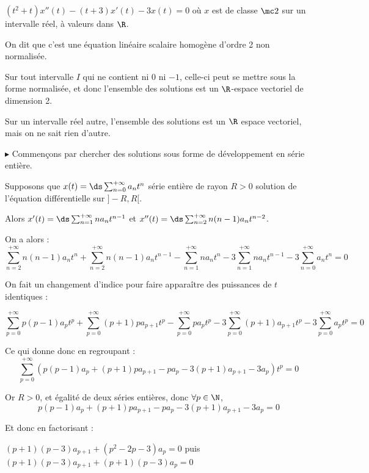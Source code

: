 \begin{exemple}
    $(t^2 + t) x''(t) - (t + 3) x'(t) - 3x(t) = 0$ où $x$ est de classe 
    $\mc 2$ sur un intervalle réel, à valeurs dans $\R$.

    On dit que c'est une équation linéaire scalaire homogène d'ordre 2 non normalisée. 

    Sur tout intervalle $I$ qui ne contient ni $0$ ni $-1$, celle-ci peut se mettre sous 
    la forme normalisée, et donc l'ensemble des solutions est un $\R$-espace vectoriel
    de dimension 2.

    Sur un intervalle réel autre, l'ensemble des solutions est un $\R$ espace vectoriel, mais 
    on ne sait rien d'autre. 

    \avspace $\blacktriangleright$ Commençons par chercher des solutions sous forme de 
    développement en série entière. 


    \svspace Supposons que $x(t) = \ds \sum_{n = 0}^{+ \infty} a_n t^n$ série entière de rayon 
    $R > 0$ solution de l'équation différentielle sur $]-R, R[$.

    Alors $x'(t) = \ds \sum_{n = 1}^{+ \infty} n a_n t^{n - 1}$ et $x''(t) = \ds \sum_{n = 2}^{+ \infty} n (n - 1) a_n t^{n - 2}$.

    On a alors : 
    $$\sum_{n = 2}^{+ \infty} n(n - 1) a_n t^n + \sum_{n = 2}^{+ \infty} n(n - 1) a_n t^{n - 1} - \sum_{n = 1}^{+ \infty} n a_n t^n - 3 \sum_{n = 1}^{+ \infty} n a_n t^{n - 1} - 3 \sum_{n = 0}^{+ \infty} a_n t^n = 0$$

    On fait un changement d'indice pour faire apparaître des puissances de $t$ identiques :

    $$\sum_{p = 0}^{+ \infty} p(p - 1) a_p t^p + \sum_{p = 0}^{+ \infty} (p + 1) p a_{p + 1} t^p - \sum_{p = 0}^{+ \infty} p a_p t^p - 3 \sum_{p = 0}^{+ \infty} (p + 1) a_{p + 1} t^p - 3 \sum_{p = 0}^{+ \infty} a_p t^p = 0$$

    Ce qui donne donc en regroupant : 
    $$\sum_{p = 0}^{+ \infty} \left( p(p - 1) a_p + (p + 1) p a_{p + 1} - p a_p - 3 (p + 1) a_{p + 1} - 3 a_p \right) t^p = 0$$

    Or $R > 0$, et égalité de deux séries entières, donc $\forall p \in \N$, 
    $$p(p - 1) a_p + (p + 1) p a_{p + 1} - p a_p - 3 (p + 1) a_{p + 1} - 3 a_p = 0$$

    Et donc en factorisant : 

    $(p + 1)(p - 3) a_{p + 1} + (p^2 -2p - 3) a_p = 0$ puis 
    $(p + 1)(p - 3) a_{p + 1} + (p + 1)(p - 3) a_p = 0$


\end{exemple}
